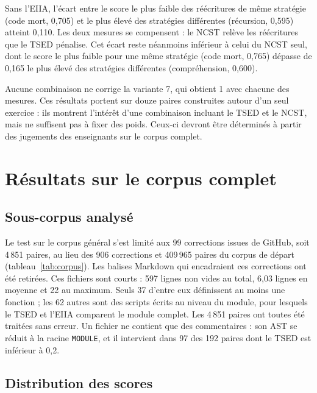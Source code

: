 \documentclass[12pt,a4paper,oneside]{report}
\begin{document}
Sans l'EIIA, l'écart entre le score le plus faible des réécritures de même
stratégie (code mort, 0,705) et le plus élevé des stratégies différentes
(récursion, 0,595) atteint 0,110. Les deux mesures se compensent : le NCST
relève les réécritures que le TSED pénalise. Cet écart reste néanmoins inférieur à celui du NCST seul,
dont le score le plus faible pour une même stratégie (code mort, 0,765)
dépasse de 0,165 le plus élevé des stratégies différentes (compréhension,
0,600).

Aucune combinaison ne corrige la variante 7, qui obtient 1 avec chacune des
mesures. Ces résultats portent sur douze paires construites autour d'un seul
exercice : ils montrent l'intérêt d'une combinaison incluant le TSED et le
NCST, mais ne suffisent pas à fixer des poids. Ceux-ci devront être
déterminés à partir des jugements des enseignants sur le corpus complet.










\section{Résultats sur le corpus complet}
\label{sec:res_corpus}

\subsection{Sous-corpus analysé}

Le test sur le corpus général s'est limité aux 99 corrections issues de
GitHub, soit 4\,851 paires, au lieu des 906 corrections et 409\,965 paires du
corpus de départ (tableau~\ref{tab:corpus}). Les balises Markdown qui
encadraient ces corrections ont été retirées. Ces fichiers sont courts : 597 lignes non vides au total, 6,03 lignes en moyenne
et 22 au maximum. Seuls 37 d'entre eux définissent au moins une fonction ;
les 62 autres sont des scripts écrits au niveau du module, pour lesquels le
TSED et l'EIIA comparent le module complet. Les 4\,851 paires ont toutes
été traitées sans erreur. Un fichier ne contient que des
commentaires : son AST se réduit à la racine \texttt{MODULE}, et il
intervient dans 97 des 192 paires dont le TSED est inférieur à 0,2.

\subsection{Distribution des scores}
\end{document}
